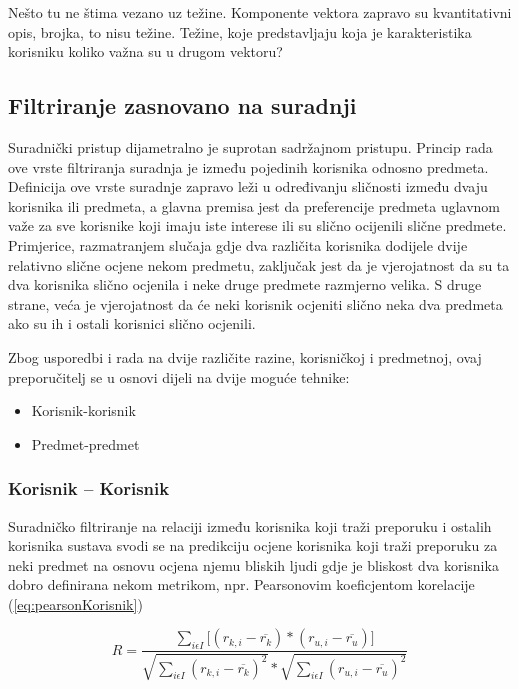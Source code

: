 \documentclass[times, utf8, diplomski, numeric]{fer}
\begin{document}
Nešto tu ne štima vezano uz težine. Komponente vektora zapravo su kvantitativni
opis, brojka, to nisu težine. Težine, koje predstavljaju koja je karakteristika
korisniku koliko važna su u drugom vektoru?

\subsection{Filtriranje zasnovano na suradnji}
Suradnički pristup dijametralno je suprotan sadržajnom pristupu. Princip rada
ove vrste filtriranja suradnja je između pojedinih korisnika odnosno predmeta.
Definicija ove vrste suradnje zapravo leži u određivanju sličnosti između dvaju
korisnika ili predmeta, a glavna premisa jest da preferencije predmeta uglavnom
važe za sve korisnike koji imaju iste interese ili su slično ocijenili slične
predmete. Primjerice, razmatranjem slučaja gdje dva različita korisnika dodijele
dvije relativno slične ocjene nekom predmetu, zaključak jest da je vjerojatnost
da su ta dva korisnika slično ocjenila i neke druge predmete razmjerno velika. S
druge strane, veća je vjerojatnost da će neki korisnik ocjeniti slično neka dva
predmeta ako su ih i ostali korisnici slično ocjenili.

Zbog usporedbi i rada na dvije različite razine, korisničkoj i predmetnoj, ovaj
preporučitelj se u osnovi dijeli na dvije moguće tehnike:
\begin{itemize}
  \item Korisnik-korisnik 
  \item Predmet-predmet 
\end{itemize}

\subsubsection{Korisnik -- Korisnik}
Suradničko filtriranje na relaciji između korisnika koji traži preporuku i
ostalih korisnika sustava svodi se na predikciju ocjene korisnika koji traži
preporuku za neki predmet na osnovu ocjena njemu bliskih ljudi gdje je bliskost
dva korisnika dobro definirana nekom metrikom, npr. Pearsonovim koeficjentom
korelacije (\ref{eq:pearsonKorisnik})

\begin{equation}
\label{eq:pearsonKorisnik}
	R = \frac
			{\sum_{i \epsilon I} 
				\big[
					(r_{k,i} - \overline{r_k}) \ast
					(r_{u,i} - \overline{r_u})
				\big]
			}
			{
				\sqrt{{\sum_{i \epsilon I} (r_{k,i} - \overline{r_k})^2}} \ast 
				\sqrt{{\sum_{i \epsilon I} (r_{u,i} - \overline{r_u})^2}}
			}
\end{equation}
\end{document}

